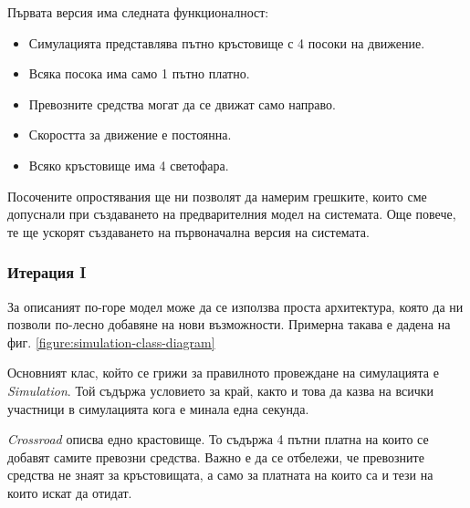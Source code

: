 		Първата версия има следната функционалност:
		\begin{itemize}
			\item Симулацията представлява пътно кръстовище с 4 посоки на движение.
			\item Всяка посока има само 1 пътно платно.
			\item Превозните средства могат да се движат само направо.
			\item Скоростта за движение е постоянна.
			\item Всяко кръстовище има 4 светофара.
		\end{itemize}
		
		Посочените опростявания ще ни позволят да намерим грешките, които сме допуснали
		при създаването на предварителния модел на системата. Още повече, 
		те ще ускорят създаването на първоначална версия на системата.
		
		\subsubsection{Итерация I}
	
			За описаният по-горе модел може да се използва проста архитектура, 
			която да ни позволи по-лесно добавяне на нови възможности. Примерна
			такава е дадена на фиг. \ref{figure:simulation-class-diagram}
			
			Основният клас, който се грижи за правилното провеждане на симулацията е \emph{Simulation}.
			Той съдържа условието за край, както и това да казва на всички участници в симулацията кога е
			минала една секунда.
			
			\emph{Crossroad} описва едно крастовище. То съдържа 4 пътни платна на които се добавят самите
			превозни средства. Важно е да се отбележи, че превозните средства не знаят за кръстовищата, а
			само за платната на които са и тези на които искат да отидат.									
		
